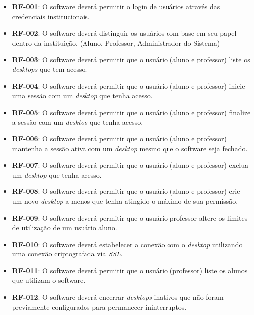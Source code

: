 \begin{itemize}
    \item \textbf{RF-001}: O software deverá permitir o login de usuários através das credenciais institucionais.

    \item \textbf{RF-002}: O software deverá distinguir os usuários com base em seu papel dentro da instituição. (Aluno, Professor, Administrador do Sistema)

    \item \textbf{RF-003}: O software deverá permitir que o usuário (aluno e professor) liste os \textit{desktops} que tem acesso.

    \item \textbf{RF-004}: O software deverá permitir que o usuário (aluno e professor) inicie uma sessão com um \textit{desktop} que tenha acesso.
    
    \item \textbf{RF-005}: O software deverá permitir que o usuário (aluno e professor) finalize a sessão com um \textit{desktop} que tenha acesso.
    
    \item \textbf{RF-006}: O software deverá permitir que o usuário (aluno e professor) mantenha a sessão ativa com um \textit{desktop} mesmo que o software seja fechado.
    
    \item \textbf{RF-007}: O software deverá permitir que o usuário (aluno e professor) exclua um \textit{desktop} que tenha acesso.

    \item \textbf{RF-008}: O software deverá permitir que o usuário (aluno e professor) crie um novo \textit{desktop} a menos que tenha atingido o máximo de sua permissão.
    
    \item \textbf{RF-009}: O software deverá permitir que o usuário professor altere os limites de utilização de um usuário aluno.

    \item \textbf{RF-010}: O software deverá estabelecer a conexão com o \textit{desktop} utilizando uma conexão criptografada via \textit{SSL}.

    \item \textbf{RF-011}: O software deverá permitir que o usuário (professor) liste os alunos que utilizam o software.

    \item \textbf{RF-012}: O software deverá encerrar \textit{desktops} inativos que não foram previamente configurados para permanecer ininterruptos.
    

\end{itemize}
